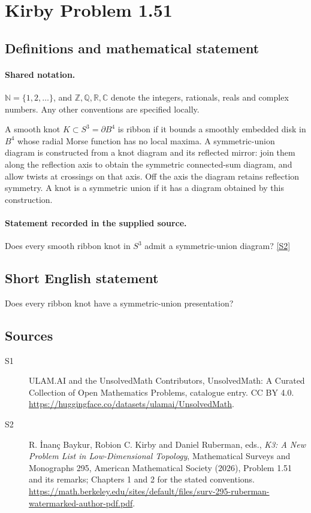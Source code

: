 \documentclass[11pt]{article}
\newcommand{\sref}[2]{\hyperlink{source:#1:#2}{[S#2]}}
\begin{document}
\section{Kirby Problem 1.51}\label{statement}

\subsection{Definitions and mathematical statement}

\paragraph{Shared notation.}$\mathbb N=\{1,2,\ldots\}$, and $\mathbb Z,\mathbb Q,\mathbb R,\mathbb C$ denote the integers, rationals, reals and complex numbers. Any other conventions are specified locally.


A smooth knot $K\subset S^3=\partial B^4$ is ribbon if it bounds a smoothly embedded disk in $B^4$ whose radial Morse function has no local maxima. A symmetric-union diagram is constructed from a knot diagram and its reflected mirror: join them along the reflection axis to obtain the symmetric connected-sum diagram, and allow twists at crossings on that axis. Off the axis the diagram retains reflection symmetry. A knot is a symmetric union if it has a diagram obtained by this construction.
\paragraph{Statement recorded in the supplied source.}
Does every smooth ribbon knot in $S^3$ admit a symmetric-union diagram? \sref{statement}{2}

\subsection{Short English statement}
Does every ribbon knot have a symmetric-union presentation?
\subsection{Sources}
\begin{description}
\item[\hypertarget{source:statement:1}{S1}] ULAM.AI and the UnsolvedMath Contributors, UnsolvedMath: A Curated Collection of Open Mathematics Problems, catalogue entry. CC BY 4.0. \url{https://huggingface.co/datasets/ulamai/UnsolvedMath}.
\item[\hypertarget{source:statement:2}{S2}] R. İnanç Baykur, Robion C. Kirby and Daniel Ruberman, eds., \emph{K3: A New Problem List in Low-Dimensional Topology}, Mathematical Surveys and Monographs 295, American Mathematical Society (2026), Problem 1.51 and its remarks; Chapters 1 and 2 for the stated conventions. \url{https://math.berkeley.edu/sites/default/files/surv-295-ruberman-watermarked-author-pdf.pdf}.
\end{description}
\label{end:statement}
\end{document}
